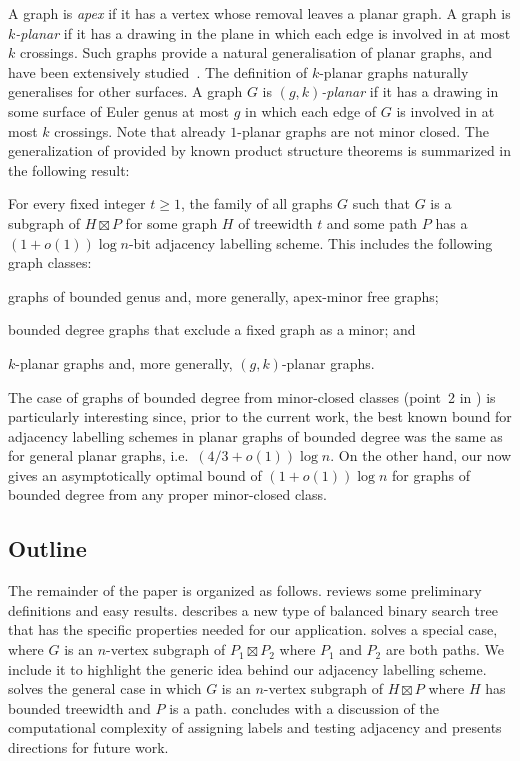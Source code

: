 \documentclass[kpfonts]{patmorin}
\let\geq\geqslant
\begin{document}
A graph is \emph{apex} if it has a vertex whose removal leaves a planar graph.
A graph is \emph{$k$-planar} if it has a drawing in the plane in which
each edge is involved in at most $k$ crossings. Such graphs provide a natural
generalisation of planar graphs, and have been extensively studied~\cite{kobourov.liotta.ea:annotated}.
The definition of $k$-planar graphs naturally generalises for other surfaces. A graph $G$ is
\emph{$(g,k)$-planar} if it has a drawing in some surface of Euler genus at most
$g$ in which each edge of $G$ is involved in at most $k$ crossings.
Note that already $1$-planar graphs are not minor closed.
The generalization of  provided by known product structure theorems is summarized in the following result:

\begin{thm}
  For every fixed integer $t\geq 1$, the family of all graphs $G$ such that $G$ is a subgraph of $H\boxtimes P$ for some graph $H$ of treewidth $t$ and some path $P$ has a $(1+o(1))\log n$-bit adjacency labelling scheme.
  This includes the following graph classes:
  \begin{compactenum}
    \item graphs of bounded genus and, more generally, apex-minor free graphs;
    \item bounded degree graphs that exclude a fixed graph as a minor; and
    \item $k$-planar graphs and, more generally, $(g,k)$-planar graphs.
  \end{compactenum}
\end{thm}

The case of graphs of bounded degree from minor-closed classes (point~2 in ) is particularly interesting since, prior to the current work, the best known bound for adjacency labelling schemes in planar graphs of bounded degree was the same as for general planar graphs, i.e.\ $(4/3+o(1))\log n$. On the other hand, our  now gives an asymptotically optimal bound of $(1+o(1))\log n$ for graphs of bounded degree from any proper minor-closed class.




\subsection{Outline}

The remainder of the paper is organized as follows.  reviews some preliminary definitions and easy results.   describes a new type of balanced binary search tree that has the specific properties needed for our application.  solves a special case, where $G$ is an $n$-vertex subgraph of $P_1\boxtimes P_2$ where $P_1$ and $P_2$ are both paths. We include it to highlight the generic idea behind our adjacency labelling scheme.  solves the general case in which $G$ is an $n$-vertex subgraph of $H\boxtimes P$ where $H$ has bounded treewidth and $P$ is a path.   concludes with a discussion of the computational complexity of assigning labels and testing adjacency and presents directions for future work.
\end{document}
